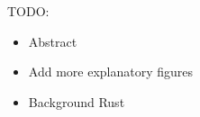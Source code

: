 \color{purple}
TODO:
\begin{itemize}
  \item Abstract
  \item Add more explanatory figures
  \item Background Rust
\end{itemize}
